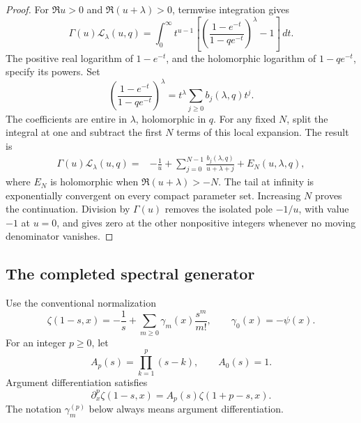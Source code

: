 \documentclass[11pt]{article}
\numberwithin{equation}{section}
\theoremstyle{plain}
\theoremstyle{definition}
\theoremstyle{remark}
\begin{document}
\begin{proof}
For \(\Re u>0\) and \(\Re(u+\lambda)>0\), termwise integration
gives
\begin{equation}\label{bhr:cxp:eq:mellin}
 \Gamma(u)\mathcal L_\lambda(u,q)
 =\int_0^\infty t^{u-1}
 \left[
 \left(\frac{1-e^{-t}}{1-qe^{-t}}\right)^\lambda-1
 \right]\,dt.
\end{equation}
The positive real logarithm of \(1-e^{-t}\), and the holomorphic
logarithm of \(1-qe^{-t}\), specify its powers.  Set
\[
 \left(\frac{1-e^{-t}}{1-qe^{-t}}\right)^\lambda
   =t^\lambda\sum_{j\ge0}b_j(\lambda,q)t^j.
\]
The coefficients are entire in \(\lambda\), holomorphic in \(q\).
For any fixed \(N\), split the integral at one and subtract the
first \(N\) terms of this local expansion.  The result is
\begin{align}
 \Gamma(u)\mathcal L_\lambda(u,q)
 ={}&-\frac1u+
   \sum_{j=0}^{N-1}\frac{b_j(\lambda,q)}{u+\lambda+j}
   +E_N(u,\lambda,q),\label{bhr:cxp:eq:subtraction}
\end{align}
where \(E_N\) is holomorphic when \(\Re(u+\lambda)>-N\).
The tail at infinity is exponentially convergent on every compact
parameter set.  Increasing \(N\) proves the continuation.  Division
by \(\Gamma(u)\) removes the isolated pole \(-1/u\), with value
\(-1\) at \(u=0\), and gives zero at the other nonpositive
integers whenever no moving denominator vanishes.
\end{proof}

\subsection{The completed spectral generator}

Use the conventional normalization
\[
 \zeta(1-s,x)=-\frac1s+
    \sum_{m\ge0}\gamma_m(x)\frac{s^m}{m!},
 \qquad \gamma_0(x)=-\psi(x).
\]
For an integer \(p\ge0\), let
\[
 A_p(s)=\prod_{k=1}^p(s-k),\qquad A_0(s)=1.
\]
Argument differentiation satisfies
\[
 \partial_x^p\zeta(1-s,x)
   =A_p(s)\zeta(1+p-s,x).
\]
The notation \(\gamma_m^{(p)}\) below always means argument
differentiation.
\end{document}
